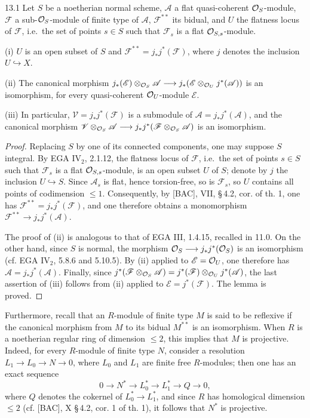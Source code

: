 \begin{lemma}{13.1}\label{VIB.13.1}
Let $S$ be a noetherian normal scheme, $\mathscr A$ a flat quasi-coherent $\mathcal{O}_S$-module, $\mathscr F$ a sub-$\mathcal{O}_S$-module of finite type of $\mathscr A$, $\mathscr F^{**}$ its bidual, and $U$ the flatness locus of $\mathscr F$, i.e.\ the set of points $s\in S$ such that $\mathscr F_s$ is a flat $\mathcal{O}_{S,s}$-module.

(i) $U$ is an open subset of $S$ and $\mathscr F^{**}=j_*j^*(\mathscr F)$, where $j$ denotes the inclusion $U\hookrightarrow X$.

(ii) The canonical morphism $j_*(\mathscr E)\otimes_{\mathcal{O}_S}\mathscr A\longrightarrow j_*(\mathscr E\otimes_{\mathcal{O}_U}j^*(\mathscr A))$ is an isomorphism, for every quasi-coherent $\mathcal{O}_U$-module $\mathscr E$.

(iii) In particular, $\mathscr V=j_*j^*(\mathscr F)$ is a submodule of $\mathscr A=j_*j^*(\mathscr A)$, and the canonical morphism $\mathscr V\otimes_{\mathcal{O}_S}\mathscr A\longrightarrow j_*j^*(\mathscr F\otimes_{\mathcal{O}_S}\mathscr A)$ is an isomorphism.
\end{lemma}
\begin{proof}
Replacing $S$ by one of its connected components, one may suppose $S$ integral. By EGA IV$_2$, 2.1.12, the flatness locus of $\mathscr F$, i.e.\ the set of points $s\in S$ such that $\mathscr F_s$ is a flat $\mathcal{O}_{S,s}$-module, is an open subset $U$ of $S$; denote by $j$ the inclusion $U\hookrightarrow S$. Since $\mathscr A_s$ is flat, hence torsion-free, so is $\mathscr F_s$, so $U$ contains all points of codimension $\leq1$. Consequently, by [BAC], VII, \S\,4.2, cor. of th. 1, one has $\mathscr F^{**}=j_*j^*(\mathscr F)$, and one therefore obtains a monomorphism $\mathscr F^{**}\to j_*j^*(\mathscr A)$.

The proof of (ii) is analogous to that of EGA III, 1.4.15, recalled in 11.0. On the other hand, since $S$ is normal, the morphism $\mathcal{O}_S\longrightarrow j_*j^*(\mathcal{O}_S)$ is an isomorphism (cf. EGA IV$_2$, 5.8.6 and 5.10.5). By (ii) applied to $\mathscr E=\mathcal{O}_U$, one therefore has $\mathscr A=j_*j^*(\mathscr A)$. Finally, since $j^*(\mathscr F\otimes_{\mathcal{O}_S}\mathscr A)=j^*(\mathscr F)\otimes_{\mathcal{O}_U}j^*(\mathscr A)$, the last assertion of (iii) follows from (ii) applied to $\mathscr E=j^*(\mathscr F)$. The lemma is proved.
\end{proof}
Furthermore, recall that an $R$-module of finite type $M$ is said to be reflexive if the canonical morphism from $M$ to its bidual $M^{**}$ is an isomorphism. When $R$ is a noetherian regular ring of dimension $\leq2$, this implies that $M$ is projective. Indeed, for every $R$-module of finite type $N$, consider a resolution $L_1\to L_0\to N\to0$, where $L_0$ and $L_1$ are finite free $R$-modules; then one has an exact sequence
\[
0\to N^*\to L_0^*\to L_1^*\to Q\to0,
\]
where $Q$ denotes the cokernel of $L_0^*\to L_1^*$, and since $R$ has homological dimension $\leq2$ (cf. [BAC], X \S\,4.2, cor. 1 of th. 1), it follows that $N^*$ is projective.

